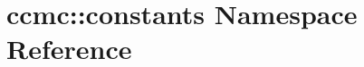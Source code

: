 \hypertarget{namespaceccmc_1_1constants}{\section{ccmc\-:\-:constants Namespace Reference}
\label{namespaceccmc_1_1constants}
}
